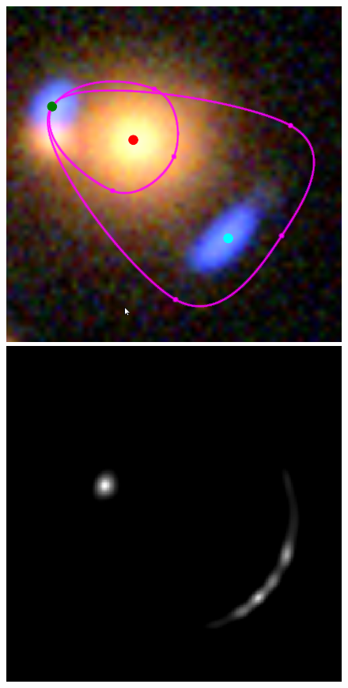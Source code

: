 \documentclass[usenatbib]{mn2e}
\newlength{\myplotswidth}
\begin{document}
\begin{figure}
  \centering
  \includegraphics[width=\myplotswidth]{fig/006975_input}
  \includegraphics[width=\myplotswidth]{fig/006975_arr_time_ipol} \\

\end{figure}
\end{document}
